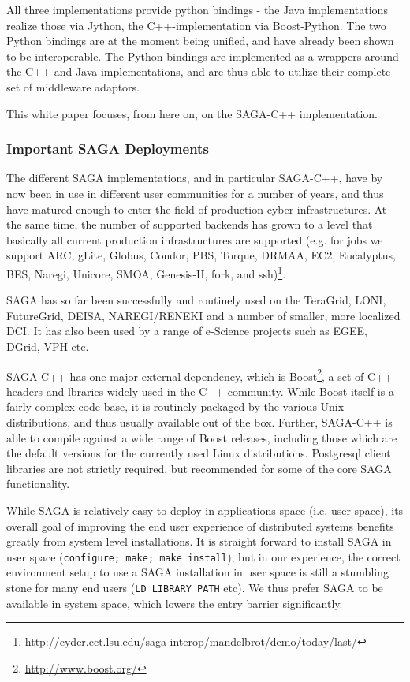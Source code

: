 \documentclass[12pt]{article}
\newcommand{\T}[1]{\texttt{#1}}
\begin{document}
   All three implementations provide python bindings - the Java
   implementations realize those via Jython, the C++-implementation
   via Boost-Python.  The two Python bindings are at the moment being
   unified, and have already been shown to be interoperable.  The
   Python bindings are implemented as a wrappers around the C++ and
   Java implementations, and are thus able to utilize their complete
   set of middleware adaptors.

   This white paper focuses, from here on, on the SAGA-C++
   implementation.


  \subsubsection{Important SAGA Deployments}

   The different SAGA implementations, and in particular SAGA-C++,
   have by now been in use in different user communities for a number
   of years, and thus have matured enough to enter the field of
   production cyber infrastructures.  At the same time, the number of
   supported backends has grown to a level that basically all current
   production infrastructures are supported (e.g. for jobs we support
   ARC, gLite, Globus, Condor, PBS, Torque, DRMAA, EC2, Eucalyptus,
   BES, Naregi, Unicore, SMOA, Genesis-II, fork, and
   ssh)\footnote{\url{http://cyder.cct.lsu.edu/saga-interop/mandelbrot/demo/today/last/}}.

   SAGA has so far been successfully and routinely used on the
   TeraGrid, LONI, FutureGrid, DEISA, NAREGI/RENEKI and a number of
   smaller, more localized DCI. It has also been used by a range of
   e-Science projects such as EGEE, DGrid, VPH etc.

   SAGA-C++ has one major external dependency, which is
   Boost\footnote{\url{http://www.boost.org/}}, a set of C++ headers
   and lbraries widely used in the C++ community.  While Boost itself
   is a fairly complex code base, it is routinely packaged by the
   various Unix distributions, and thus usually available out of the
   box.  Further, SAGA-C++ is able to compile against a wide range of
   Boost releases, including those which are the default versions for
   the currently used Linux distributions.  Postgresql client
   libraries are not strictly required, but recommended for some of
   the core SAGA functionality.

   While SAGA is relatively easy to deploy in applications space (i.e.
   user space), its overall goal of improving the end user experience
   of distributed systems benefits greatly from system level
   installations.  It is straight forward to install SAGA in user
   space (\T{configure; make; make install}), but in our experience,
   the correct environment setup to use a SAGA installation in user
   space is still a stumbling stone for many end users
   (\T{LD\_LIBRARY\_PATH} etc).  We thus prefer SAGA to be available
   in system space, which lowers the entry barrier significantly.  
\end{document}
